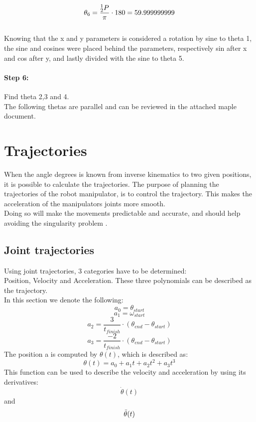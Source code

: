 \begin{equation}
\centering
\theta_6 = \frac{^1_2 P}{\pi} \cdot 180 = 59.999999999
\label{}
\end{equation}\\

Knowing that the x and y parameters is considered a rotation by sine to theta 1, the sine and cosines were placed behind the parameters, respectively sin after x and cos after y, and lastly divided with the sine to theta 5.

\paragraph{Step 6:} Find theta 2,3 and 4.\\

The following thetas are parallel and can be reviewed in the attached maple document.\\


\section{Trajectories}
When the angle degrees is known from inverse kinematics to two given positions, it is possible to calculate the trajectories. The purpose of planning the trajectories of the robot manipulator, is to control the trajectory. This makes the acceleration of the manipulators joints more smooth.\\
Doing so will make the movements predictable and accurate, and should help avoiding the singularity problem \cite{Trajectory}. 


\subsection{Joint trajectories}

Using joint trajectories, 3 categories have to be determined:\\
Position, Velocity and Acceleration.
These three polynomials can be described as the trajectory.\\
In this section we denote the following:
\begin{equation}
    a_0 =\theta_{start} 
\end{equation}
\begin{equation}
    a_1 = \omega_{start}
\end{equation}
\begin{equation}
    a_2 = \frac{3}{t_{finish}} \cdot (\theta_{end} - \theta_{start})
\end{equation}
\begin{equation}
    a_3 = \frac{-2}{t_{finish}} \cdot (\theta_{end} - \theta_{start})
\end{equation}
The position a is computed by \(\theta(t)\), which is described as: \[\theta(t)=a_0+a_1t+a_2t^2+a_3t^3\]
This function can be used to describe the velocity and acceleration by using its derivatives\cite{JointTrajectories}:\[\Dot{\theta}(t)\] and \[\Ddot{\theta}(t)\]

